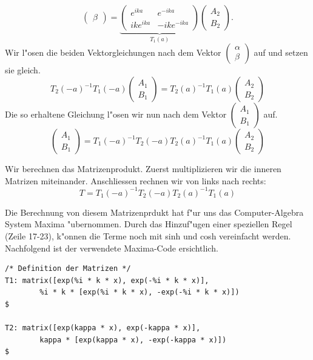 \begin{refsection}
\[\begin{pmatrix}
\beta
\end{pmatrix}
 = 
\underbrace{
\begin{pmatrix}
e^{ika}
&
e^{-ika}
\\
ike^{ika}
&
-ike^{-ika}
\end{pmatrix}
}_{T_1(a)}
\begin{pmatrix}
A_2
\\
B_2
\end{pmatrix}.
\]
Wir l"osen die beiden Vektorgleichungen nach dem Vektor
$
\begin{pmatrix}
\alpha
\\
\beta
\end{pmatrix}
$
auf und setzen sie gleich.
\[
T_2(-a)^{-1}T_1(-a)
\begin{pmatrix}
A_1
\\
B_1
\end{pmatrix}
=
T_2(a)^{-1}T_1(a)
\begin{pmatrix}
A_2
\\
B_2
\end{pmatrix}
\]
Die so erhaltene Gleichung l"osen wir nun nach dem Vektor
$
\begin{pmatrix}
A_1
\\
B_1
\end{pmatrix}
$
auf.
\[
\begin{pmatrix}
A_1
\\
B_1
\end{pmatrix}
=
T_1(-a)^{-1}T_2(-a)T_2(a)^{-1}T_1(a)
\begin{pmatrix}
A_2
\\
B_2
\end{pmatrix}
\]

Wir berechnen das Matrizenprodukt. 
Zuerst multiplizieren wir die inneren Matrizen miteinander. 
Anschliessen rechnen wir von links nach rechts:
\[
T = T_1(-a)^{-1}T_2(-a)T_2(a)^{-1}T_1(a)
\]

Die Berechnung von diesem Matrizenprdukt hat f"ur uns das Computer-Algebra System Maxima "ubernommen. 
Durch das Hinzuf"ugen einer speziellen Regel (Zeile 17-23), k"onnen die Terme noch mit sinh und cosh vereinfacht werden.
Nachfolgend ist der verwendete Maxima-Code ersichtlich.

\begin{lstlisting}[style=Maxima]
/* Definition der Matrizen */
T1: matrix([exp(%i * k * x), exp(-%i * k * x)],
        %i * k * [exp(%i * k * x), -exp(-%i * k * x)])                      $

T2: matrix([exp(kappa * x), exp(-kappa * x)],
        kappa * [exp(kappa * x), -exp(-kappa * x)])                         $


\end{lstlisting}
\end{refsection}

